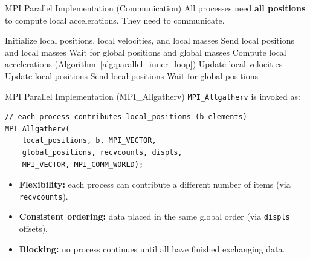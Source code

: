 \documentclass{beamer}
\begin{document}
\begin{frame}{MPI Parallel Implementation (Communication)}
All processes need \textbf{all positions} to compute local accelerations. They need to communicate.
\begin{algorithm}[H]
\caption{Parallel N-body (single-process view)}
\label{alg:parallel}
\begin{algorithmic}[1]
\State Initialize local positions, local velocities, and local masses
\State Send local positions and local masses
\State Wait for global positions and global masses
    \State Compute local accelerations (Algorithm~\ref{alg:parallel_inner_loop})
    \State Update local velocities
    \State Update local positions
    \State Send local positions
    \State Wait for global positions
\EndFor
\end{algorithmic}
\end{algorithm}
\end{frame}

\begin{frame}[fragile]{MPI Parallel Implementation (MPI\_Allgatherv)}
\texttt{MPI\_Allgatherv} is invoked as:
\begin{lstlisting}[style=nbody]
// each process contributes local_positions (b elements)
MPI_Allgatherv(
    local_positions, b, MPI_VECTOR,
    global_positions, recvcounts, displs,
    MPI_VECTOR, MPI_COMM_WORLD);
\end{lstlisting}

\begin{itemize}
  \item \textbf{Flexibility:} each process can contribute a different number of items 
        (via \texttt{recvcounts}).
  \item \textbf{Consistent ordering:} data placed in the same global order 
        (via \texttt{displs} offsets).
  \item \textbf{Blocking:} no process continues until all have finished exchanging data.
\end{itemize}
\end{frame}
\end{document}
